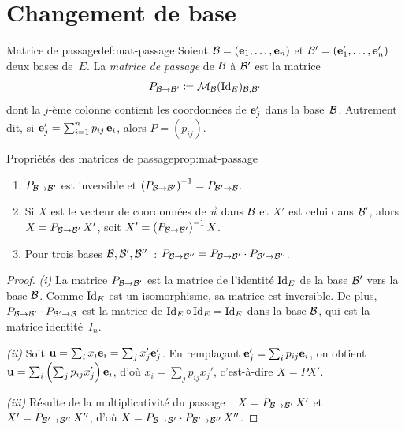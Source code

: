 \section{Changement de base}\label{sec:changement-base}

\begin{definition}{Matrice de passage}{def:mat-passage}
  Soient ${\mathcal{B}}=(\mathbf{e}_{1},\ldots,\mathbf{e}_{n})$ et
  ${\mathcal{B}}'=(\mathbf{e}_{1}',\ldots,\mathbf{e}_{n}')$ deux bases de~$E$. La
  \emph{matrice de passage} de ${\mathcal{B}}$ à ${\mathcal{B}}'$
  est la matrice
  \[
    P_{{\mathcal{B}}\to{\mathcal{B}}'}\coloneqq\mathcal{M}_{\mathcal{B}}(\operatorname{Id}_E)_{{\mathcal{B}},{\mathcal{B}}'}
  \]
  dont la $j$-ème colonne contient les coordonnées de $\mathbf{e}_{j}'$ dans la
  base~${\mathcal{B}}$. Autrement dit, si
  $\mathbf{e}_{j}'=\sum_{i=1}^n p_{ij}\,\mathbf{e}_{i}$, alors $P=(p_{ij})$.
\end{definition}

\begin{proposition}{Propriétés des matrices de passage}{prop:mat-passage}
  \begin{enumerate}[label=(\roman*)]
    \item $P_{{\mathcal{B}}\to{\mathcal{B}}'}$ est inversible et
      ${(P_{{\mathcal{B}}\to{\mathcal{B}}'})}^{-1}=P_{{\mathcal{B}}'\to{\mathcal{B}}}$.
    \item Si $X$ est le vecteur de coordonnées de $\vec{u}$ dans ${\mathcal{B}}$ et
      $X'$ est celui dans ${\mathcal{B}}'$, alors $X=P_{{\mathcal{B}}\to{\mathcal{B}}'}\,X'$, soit
      $X'={(P_{{\mathcal{B}}\to{\mathcal{B}}'})}^{-1}\,X$.
    \item Pour trois bases ${\mathcal{B}},{\mathcal{B}}',{\mathcal{B}}''$~:
      $P_{{\mathcal{B}}\to{\mathcal{B}}''}=P_{{\mathcal{B}}\to{\mathcal{B}}'}\cdot P_{{\mathcal{B}}'\to{\mathcal{B}}''}$.
  \end{enumerate}
\end{proposition}

\begin{proof}
  \emph{(i)} La matrice $P_{{\mathcal{B}}\to{\mathcal{B}}'}$ est la matrice de l'identité
  $\operatorname{Id}_E$ de la base ${\mathcal{B}}'$ vers la base ${\mathcal{B}}$. Comme $\operatorname{Id}_E$ est un
  isomorphisme, sa matrice est inversible. De plus,
  $P_{{\mathcal{B}}\to{\mathcal{B}}'}\cdot P_{{\mathcal{B}}'\to{\mathcal{B}}}$ est la matrice de
  $\operatorname{Id}_E\circ\operatorname{Id}_E=\operatorname{Id}_E$ dans la base ${\mathcal{B}}$, qui est la matrice
  identité~$I_n$.

  \emph{(ii)} Soit $\mathbf{u}=\sum_i x_i\mathbf{e}_{i}=\sum_j x_j'\mathbf{e}_{j}'$.
  En remplaçant $\mathbf{e}_{j}'=\sum_i p_{ij}\mathbf{e}_{i}$, on obtient
  $\mathbf{u}=\sum_i\left(\sum_j p_{ij}x_j'\right)\mathbf{e}_{i}$, d'où
  $x_i=\sum_j p_{ij}x_j'$, c'est-à-dire $X=PX'$.

  \emph{(iii)} Résulte de la multiplicativité du passage~:
  $X=P_{{\mathcal{B}}\to{\mathcal{B}}'}\,X'$ et $X'=P_{{\mathcal{B}}'\to{\mathcal{B}}''}\,X''$, d'où
  $X=P_{{\mathcal{B}}\to{\mathcal{B}}'}\cdot P_{{\mathcal{B}}'\to{\mathcal{B}}''}\,X''$.
\end{proof}

